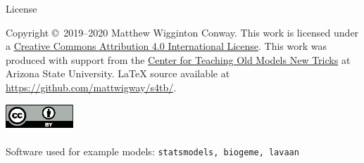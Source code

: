 \begin{frame}{License}
  \begin{center}
    Copyright \copyright~2019--2020 Matthew Wigginton Conway. This work is licensed under a \href{https://creativecommons.org/licenses/by/4.0}{Creative Commons Attribution 4.0 International License}. This work was produced with support from the \href{https://tomnet-utc.org}{Center for Teaching Old Models New Tricks} at Arizona State University. LaTeX source available at \url{https://github.com/mattwigway/s4tb/}.

    \includegraphics[width=1in]{cc-by.eps}\\
    ~\\
    Software used for example models: \texttt{statsmodels, biogeme, lavaan}
  \end{center}
\end{frame}
